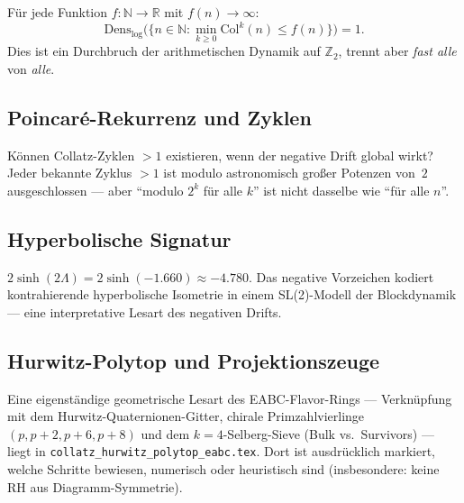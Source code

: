 \documentclass[12pt,a4paper]{article}
\newcommand{\N}{\mathbb{N}}
\newcommand{\R}{\mathbb{R}}
\newcommand{\Ztwo}{\mathbb{Z}_2}
\newcommand{\col}{\mathrm{Col}}
\newcommand{\Lam}{\Lambda}
\begin{document}
Für jede Funktion $f:\N\to\R$ mit $f(n)\to\infty$:
\[
  \mathrm{Dens}_{\log}\bigl(\{n\in\N : \min_{k\geq 0}\col^k(n)\leq f(n)\}\bigr)=1.
\]
Dies ist ein Durchbruch der arithmetischen Dynamik auf $\Ztwo$, trennt
aber \emph{fast alle} von \emph{alle}.

\subsection{Poincaré-Rekurrenz und Zyklen}

Können Collatz-Zyklen $>1$ existieren, wenn der negative Drift global
wirkt? Jeder bekannte Zyklus $>1$ ist modulo astronomisch großer Potenzen
von~$2$ ausgeschlossen --- aber ``modulo $2^k$ für alle $k$'' ist nicht
dasselbe wie ``für alle $n$''.

\subsection{Hyperbolische Signatur}

$2\sinh(2\Lam) = 2\sinh(-1.660) \approx -4.780$. Das negative Vorzeichen
kodiert kontrahierende hyperbolische Isometrie in einem SL(2)-Modell der
Blockdynamik --- eine interpretative Lesart des negativen Drifts.

\subsection{Hurwitz-Polytop und Projektionszeuge}

Eine eigenständige geometrische Lesart des EABC-Flavor-Rings --- Verknüpfung
mit dem Hurwitz-Quaternionen-Gitter, chirale Primzahlvierlinge
$(p,p+2,p+6,p+8)$ und dem $k=4$-Selberg-Sieve (Bulk vs.\ Survivors) ---
liegt in \texttt{collatz\_hurwitz\_polytop\_eabc.tex}.
Dort ist ausdrücklich markiert, welche Schritte bewiesen, numerisch oder
heuristisch sind (insbesondere: keine RH aus Diagramm-Symmetrie).
\end{document}
